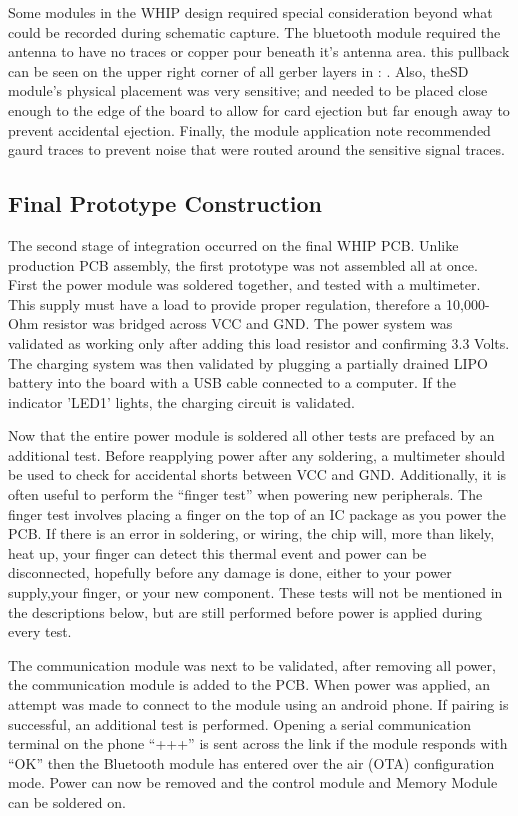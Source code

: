 Some modules in the WHIP design required special consideration beyond what could be recorded during schematic capture. The bluetooth module required the antenna to have no traces or copper pour beneath it's antenna area. this pullback can be seen on the upper right corner of all gerber layers in  : . Also, theSD module's physical placement was very sensitive; and needed to be placed close enough to the edge of the board to allow for card ejection but far enough away to prevent accidental ejection. Finally, the  module application note recommended gaurd traces to prevent noise that were routed around the sensitive signal traces. 


\subsection {Final Prototype Construction}
The second stage of integration occurred on the final WHIP PCB. Unlike production PCB assembly, the first prototype was not assembled all at once. First the power module was soldered together, and tested with a multimeter. This supply must have a load to provide proper regulation, therefore a 10,000-Ohm resistor was bridged across VCC and GND. The power system was validated as working only after adding this load resistor and confirming 3.3 Volts. The charging system was then validated by plugging a partially drained LIPO battery into the board with a USB cable connected to a computer. If the indicator 'LED1' lights, the charging circuit is validated. 

Now that the entire power module is soldered all other tests are prefaced by an additional test. Before reapplying power after any soldering, a multimeter should be used to check for accidental shorts between VCC and GND. Additionally, it is often useful to perform the ``finger test'' when powering new peripherals. The finger test involves placing a finger on the top of an IC package as you power the PCB. If there is an error in soldering, or wiring, the chip will, more than likely, heat up, your finger can detect this thermal event and power can be disconnected, hopefully before any damage is done, either to your power supply,your finger, or your new component. These tests will not be mentioned in the descriptions below, but are still performed before power is applied during every test.

The communication module was next to be validated, after removing all power, the communication module is added to the PCB. When power was applied, an attempt was made to connect to the module using an android phone. If pairing is successful, an additional test is performed. Opening a serial communication terminal on the phone ``+++'' is sent across the link if the module responds with ``OK'' then the Bluetooth module has entered over the air (OTA) configuration mode. Power can now be removed and the control module and Memory Module can be soldered on. 

